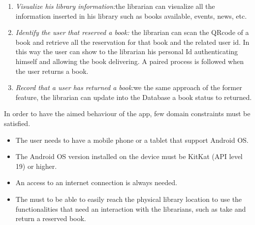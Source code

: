 \begin{enumerate}
\item \emph{Visualize his library information:}the librarian can visualize all the information inserted in his library such as books available, events, news, etc.
\item \emph{Identify the user that reserved a book:} the librarian can scan the QRcode of a book and retrieve all the reservation for that book and the related user id. In this way the user can show to the librarian his personal Id authenticating himself and allowing the book delivering. A paired process is followed when the user returns a book.
\item \emph{Record that a user has returned a book:}we the same approach of the former feature, the librarian can update into the Database a book status to returned.
\end{enumerate}


In order to have the aimed behaviour of the app, few domain constraints must be satisfied.

\begin{itemize}
	\item The user needs to have a mobile phone or a tablet that support Android OS.
	\item The Android OS version installed on the device must be KitKat (API level 19) or higher.
	\item An access to an internet connection is always needed.
	\item The must to be able to easily reach the physical library location to use the functionalities that need an interaction with the librarians, such as take and return a reserved book.
\end{itemize}